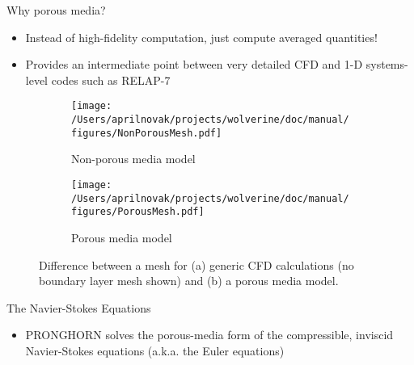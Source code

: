 \documentclass{beamer}
\begin{document}

\begin{frame}{Why porous media?}

\begin{itemize}
\item Instead of high-fidelity computation, just compute averaged quantities!
\item Provides an intermediate point between very detailed CFD and 1-D systems-level codes such as RELAP-7\newline
\end{itemize}

\begin{figure}[H]
\centering
\begin{subfigure}{.25\textwidth}
  \centering
  \texttt{[image: /Users/aprilnovak/projects/wolverine/doc/manual/figures/NonPorousMesh.pdf]}
  \caption{Non-porous media model}
\end{subfigure}
\begin{subfigure}{.25\textwidth}
  \centering
  \texttt{[image: /Users/aprilnovak/projects/wolverine/doc/manual/figures/PorousMesh.pdf]}
  \caption{Porous media model}
\end{subfigure}
\caption{Difference between a mesh for (a) generic CFD calculations (no boundary layer mesh shown) and (b) a porous media model.}
\end{figure}

\end{frame}


\begin{frame}{The Navier-Stokes Equations}

\begin{itemize}
\item PRONGHORN solves the porous-media form of the compressible, inviscid Navier-Stokes equations (a.k.a. the Euler equations)
\end{itemize}

\end{frame}

\end{document}
